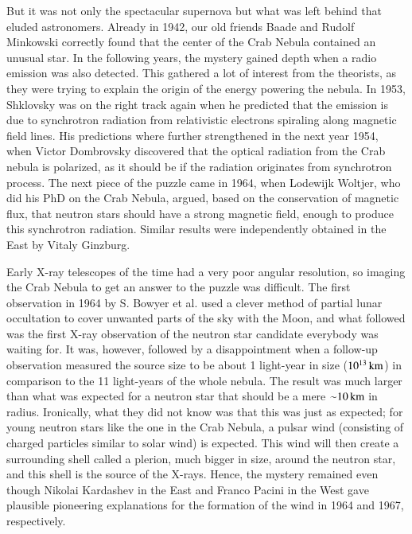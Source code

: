 But it was not only the spectacular supernova but what was left behind that eluded astronomers.
Already in 1942, our old friends Baade and Rudolf Minkowski correctly found that the center of the Crab Nebula contained an unusual star.\cite{Baade42, Minkowski42}
In the following years, the mystery gained depth when a radio emission was also detected.\cite{BSS49}
This gathered a lot of interest from the theorists, as they were trying to explain the origin of the energy powering the nebula.
In 1953, Shklovsky was on the right track again when he predicted that the emission is due to synchrotron radiation from relativistic electrons spiraling along magnetic field lines. 
His predictions where further strengthened in the next year 1954, when Victor Dombrovsky discovered that the optical radiation from the Crab nebula is polarized,\cite{Dombrovsky54} as it should be if the radiation originates from synchrotron process.
The next piece of the puzzle came in 1964, when Lodewijk Woltjer, who did his PhD on the Crab Nebula, argued, based on the conservation of magnetic flux, that neutron stars should have a strong magnetic field, enough to produce this synchrotron radiation.\cite{Woltjer64}
Similar results were independently obtained in the East by Vitaly Ginzburg.\cite{Ginzburg64}


Early X-ray telescopes of the time had a very poor angular resolution, so imaging the Crab Nebula to get an answer to the puzzle was difficult.
The first observation in 1964 by S. Bowyer et al. used a clever method of partial lunar occultation to cover unwanted parts of the sky with the Moon, and what followed was the first X-ray observation of the neutron star candidate everybody was waiting for.\cite{BBC64a}
It was, however, followed by a disappointment when a follow-up observation measured the source size to be about 1 light-year in size ($10^{13}\, \mathrm{km}$) in comparison to the 11 light-years of the whole nebula.\cite{BBC64b}
The result was much larger than what was expected for a neutron star that should be a mere $\mathord{\sim} 10\, \mathrm{km}$ in radius.
Ironically, what they did not know was that this was just as expected;
for young neutron stars like the one in the Crab Nebula, a pulsar wind (consisting of charged particles similar to solar wind) is expected. 
This wind will then create a surrounding shell called a plerion, much bigger in size, around the neutron star, and this shell is the source of the X-rays.
Hence, the mystery remained even though Nikolai Kardashev in the East and Franco Pacini in the West gave plausible pioneering explanations for the formation of the wind in 1964 and 1967, respectively.\cite{Kardashev64, Pacini67}


